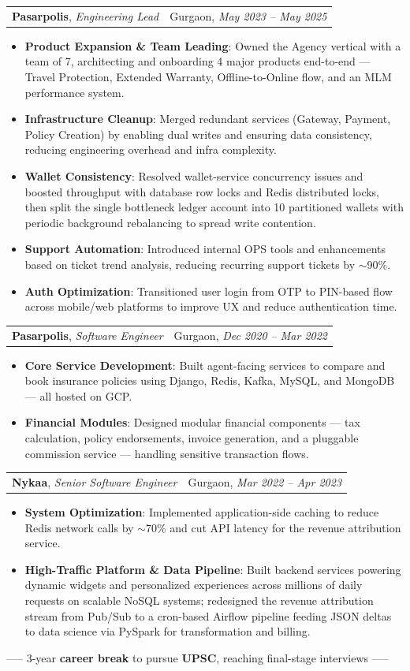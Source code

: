 \documentclass[letterpaper,10.5pt]{extarticle}
\makeatletter
\newcommand{\resumeItem}[2]{\item\small{\textbf{#1}: #2}\vspace{-2pt}}
\newcommand{\resumeSubheading}[4]{
	\vspace{-1pt}\item
	\begin{tabular*}{0.97\textwidth}{l@{\extracolsep{\fill}}r}
		\textbf{#1}, \textit{\small #3} & #2, \textit{\small #4} \\
	\end{tabular*}\vspace{-5pt}
}
\newcommand{\resumeItemListStart}{\begin{itemize}}
\newcommand{\resumeItemListEnd}{\end{itemize}\vspace{-5pt}}
\makeatother
\begin{document}
	\resumeSubheading
	{Pasarpolis}{Gurgaon}
	{Engineering Lead}{May 2023 -- May 2025}
	\resumeItemListStart
	\resumeItem{Product Expansion \& Team Leading}
	{Owned the Agency vertical with a team of 7, architecting and onboarding 4 major products end-to-end — Travel Protection, Extended Warranty, Offline-to-Online flow, and an MLM performance system.}
	\resumeItem{Infrastructure Cleanup}
	{Merged redundant services (Gateway, Payment, Policy Creation) by enabling dual writes and ensuring data consistency, reducing engineering overhead and infra complexity.}
	\resumeItem{Wallet Consistency}
	{Resolved wallet-service concurrency issues and boosted throughput with database row locks and Redis distributed locks, then split the single bottleneck ledger account into 10 partitioned wallets with periodic background rebalancing to spread write contention.}
	\resumeItem{Support Automation}
	{Introduced internal OPS tools and enhancements based on ticket trend analysis, reducing recurring support tickets by $\sim$90\%.}
	\resumeItem{Auth Optimization}
	{Transitioned user login from OTP to PIN-based flow across mobile/web platforms to improve UX and reduce authentication time.}
	\resumeItemListEnd

	\resumeSubheading
	{Pasarpolis}{Gurgaon}
	{Software Engineer}{Dec 2020 -- Mar 2022}
	\resumeItemListStart
	\resumeItem{Core Service Development}
	{Built agent-facing services to compare and book insurance policies using Django, Redis, Kafka, MySQL, and MongoDB — all hosted on GCP.}
	\resumeItem{Financial Modules}
	{Designed modular financial components — tax calculation, policy endorsements, invoice generation, and a pluggable commission service — handling sensitive transaction flows.}
	\resumeItemListEnd

	\resumeSubheading
	{Nykaa}{Gurgaon}
	{Senior Software Engineer}{Mar 2022 -- Apr 2023}
	\resumeItemListStart
	\resumeItem{System Optimization}
	{Implemented application-side caching to reduce Redis network calls by $\sim$70\% and cut API latency for the revenue attribution service.}
	\resumeItem{High-Traffic Platform \& Data Pipeline}
	{Built backend services powering dynamic widgets and personalized experiences across millions of daily requests on scalable NoSQL systems; redesigned the revenue attribution stream from Pub/Sub to a cron-based Airflow pipeline feeding JSON deltas to data science via PySpark for transformation and billing.}
	\resumeItemListEnd
	
	\bigbreak
	\centerline{----- 3-year \textbf{career break} to pursue \textbf{UPSC}, reaching final-stage interviews -----}
	\bigbreak
	
\end{document}
